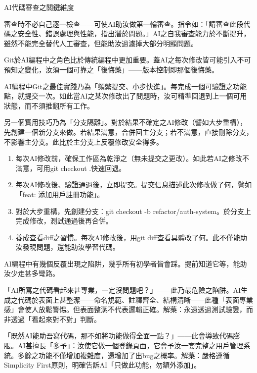 \begin{center}\small\color{gray}AI代碼審查之關鍵維度\end{center}

審查時不必自己逐一檢查——可使AI助汝做第一輪審查。指令如：「請審查此段代碼之安全性、錯誤處理與性能，指出潛於問題。」AI之自我審查能力於不斷提升，雖然不能完全替代人工審查，但能助汝過濾掉大部分明顯問題。


Git於AI編程中之角色比於傳統編程中更加重要。蓋AI之每次修改皆可能引入不可預知之變化，汝須一個可靠之「後悔藥」——版本控制即那個後悔藥。

AI編程中Git之最佳實踐乃為「頻繁提交、小步快進」。每完成一個可驗證之功能點，就提交一次。如此當AI之某次修改出了問題時，汝可精準回退到上一個可用狀態，而不須推翻所有工作。

另一個實用技巧乃為「分支隔離」。對於結果不確定之AI修改（譬如大步重構），先創建一個新分支來做。若結果滿意，合併回主分支；若不滿意，直接刪除分支，不影響主分支。此比於主分支上反覆修改安全得多。

\begin{enumerate}
  \item 每次AI修改前，確保工作區為乾淨之（無未提交之更改）。如此若AI之修改不滿意，可用git checkout .快速回退。
  \item 每次AI修改後、驗證通過後，立即提交。提交信息描述此次修改做了何，譬如「feat: 添加用戶註冊功能」。
  \item 對於大步重構，先創建分支：git checkout -b refactor/auth-system。於分支上完成修改，測試通過後再合併。
  \item 養成查看diff之習慣。每次AI修改後，用git diff查看具體改了何。此不僅能助汝發現問題，還能助汝學習代碼。
\end{enumerate}


AI編程中有幾個反覆出現之陷阱，幾乎所有初學者皆會踩。提前知道它等，能助汝少走甚多彎路。


「AI所寫之代碼看起來甚專業，一定沒問題吧？」——此乃最危險之陷阱。AI生成之代碼於表面上甚整潔——命名規範、註釋齊全、結構清晰——此種「表面專業感」會使人放鬆警惕。但表面整潔不代表邏輯正確。解藥：永遠透過測試驗證，而非透過「看起來對不對」判斷。


「既然AI能助吾寫代碼，那不如將功能做得全面一點？」——此會導致代碼膨脹。AI甚擅長「多予」：汝使它做一個登錄頁面，它會予汝一套完整之用戶管理系統。多餘之功能不僅增加複雜度，還增加了出bug之概率。解藥：嚴格遵循Simplicity First原則，明確告訴AI「只做此功能，勿額外添加」。

